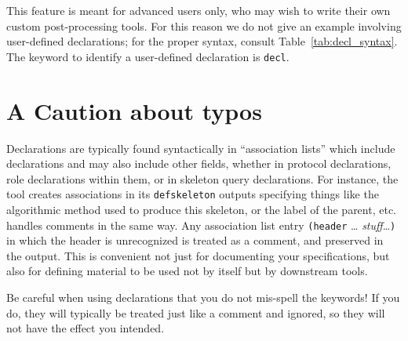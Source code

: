   This feature is meant
for advanced users only, who may wish to write their own custom
post-processing tools.  For this reason we do not give an example
involving user-defined declarations; for the proper syntax, consult
Table~\ref{tab:decl_syntax}.  The keyword to identify a user-defined
declaration is \texttt{decl}.

\fi

\section{A Caution about typos}
Declarations are typically found syntactically in ``association
lists'' which include declarations and may also include other fields,
whether in protocol declarations, role declarations within them, or in
skeleton query declarations.  For instance, the {\cpsa} tool creates
associations in its \texttt{defskeleton} outputs specifying things
like the algorithmic method used to produce this skeleton, or the
label of the parent, etc.  {\cpsa} handles comments in the same way.
Any association list entry \verb|(header| \dots
\emph{stuff}\dots\verb|)| in which the header is unrecognized is
treated as a comment, and preserved in the output.  This is convenient
not just for documenting your specifications, but also for defining
material to be used not by {\cpsa} itself but by downstream tools.

Be careful when using declarations that you do not mis-spell the
keywords!  If you do, they will typically be treated just like a
comment and ignored, so they will not have the effect you intended.

